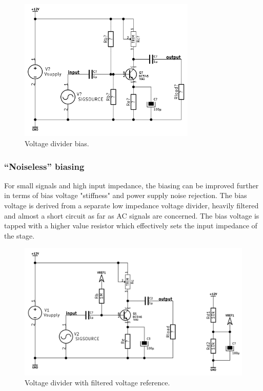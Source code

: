 \documentclass[11pt,a4paper]{article}
\begin{document}
\begin{figure}[htbp]
    \centering
    \includegraphics[width=0.75\textwidth]{img/bjt-bias_2AC_improved.png}
    \caption{Voltage divider bias.}
    \label{fig:bjt-bias_2AC_improved}
\end{figure}

\subsubsection{``Noiseless'' biasing}\label{noiseless-biasing}
For small signals and high input impedance, the biasing can be improved further
in terms of bias voltage "stiffness" and power supply noise rejection. 
The bias voltage is derived from a separate low impedance voltage divider,
heavily filtered and almost a short circuit as far as AC signals are concerned.
The bias voltage is tapped with a higher value resistor which effectively sets
the input impedance of the stage.


\begin{figure}[htbp]
    \centering
    \includegraphics[width=\textwidth]{img/bjt-bias_2AC_quiet.png}
    \caption{Voltage divider with filtered voltage reference.}
    \label{fig:bjt-bias_2AC_quiet}
\end{figure}
\end{document}
